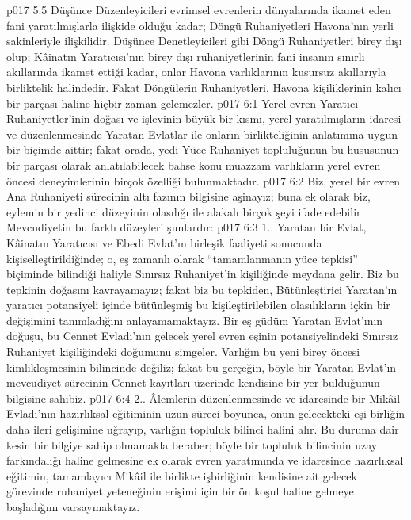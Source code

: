 \vs p017 5:5 Düşünce Düzenleyicileri evrimsel evrenlerin dünyalarında ikamet eden fani yaratılmışlarla ilişkide olduğu kadar; Döngü Ruhaniyetleri Havona’nın yerli sakinleriyle ilişkilidir. Düşünce Denetleyicileri gibi Döngü Ruhaniyetleri birey dışı olup; Kâinatın Yaratıcısı’nın birey dışı ruhaniyetlerinin fani insanın sınırlı akıllarında ikamet ettiği kadar, onlar Havona varlıklarının kusursuz akıllarıyla birliktelik halindedir. Fakat Döngülerin Ruhaniyetleri, Havona kişiliklerinin kalıcı bir parçası haline hiçbir zaman gelemezler.
\vs p017 6:1 Yerel evren Yaratıcı Ruhaniyetler’inin doğası ve işlevinin büyük bir kısmı, yerel yaratılmışların idaresi ve düzenlenmesinde Yaratan Evlatlar ile onların birlikteliğinin anlatımına uygun bir biçimde aittir; fakat orada, yedi Yüce Ruhaniyet topluluğunun bu hususunun bir parçası olarak anlatılabilecek bahse konu muazzam varlıkların yerel evren öncesi deneyimlerinin birçok özelliği bulunmaktadır.
\vs p017 6:2 Biz, yerel bir evren Ana Ruhaniyeti sürecinin altı fazının bilgisine aşinayız; buna ek olarak biz, eylemin bir yedinci düzeyinin olasılığı ile alakalı birçok şeyi ifade edebilir Mevcudiyetin bu farklı düzeyleri şunlardır:
\vs p017 6:3 1.\bibnobreakspace {}. Yaratan bir Evlat, Kâinatın Yaratıcısı ve Ebedi Evlat’ın birleşik faaliyeti sonucunda kişiselleştirildiğinde; o, eş zamanlı olarak “tamamlanmanın yüce tepkisi” biçiminde bilindiği haliyle Sınırsız Ruhaniyet’in kişiliğinde meydana gelir. Biz bu tepkinin doğasını kavrayamayız; fakat biz bu tepkiden, Bütünleştirici Yaratan’ın yaratıcı potansiyeli içinde bütünleşmiş bu kişileştirilebilen olasılıkların içkin bir değişimini tanımladığını anlayamamaktayız. Bir eş güdüm Yaratan Evlat’ının doğuşu, bu Cennet Evladı’nın gelecek yerel evren eşinin potansiyelindeki Sınırsız Ruhaniyet kişiliğindeki doğumunu simgeler. Varlığın bu yeni birey öncesi kimlikleşmesinin bilincinde değiliz; fakat bu gerçeğin, böyle bir Yaratan Evlat’ın mevcudiyet sürecinin Cennet kayıtları üzerinde kendisine bir yer bulduğunun bilgisine sahibiz.
\vs p017 6:4 2.\bibnobreakspace {}. Âlemlerin düzenlenmesinde ve idaresinde bir Mikâil Evladı’nın hazırlıksal eğitiminin uzun süreci boyunca, onun gelecekteki eşi birliğin daha ileri gelişimine uğrayıp, varlığın topluluk bilinci halini alır. Bu duruma dair kesin bir bilgiye sahip olmamakla beraber; böyle bir topluluk bilincinin uzay farkındalığı haline gelmesine ek olarak evren yaratımında ve idaresinde hazırlıksal eğitimin, tamamlayıcı Mikâil ile birlikte işbirliğinin kendisine ait gelecek görevinde ruhaniyet yeteneğinin erişimi için bir ön koşul haline gelmeye başladığını varsaymaktayız.

